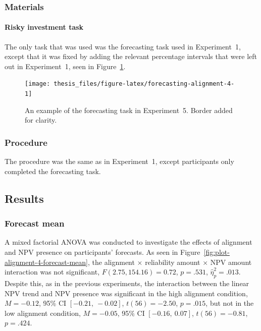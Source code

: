 \documentclass[a4paper, nobind, dvipsnames]{templates/ociamthesis}
\theoremstyle{definition}
\theoremstyle{definition}
\theoremstyle{definition}
\theoremstyle{definition}
\theoremstyle{remark}
\begin{document}
\subsubsection{Materials}

\paragraph{Risky investment task}

The only task that was used was the forecasting task used in Experiment~1,
except that it was fixed by adding the relevant percentage intervals that were
left out in Experiment~1, seen in Figure~\ref{fig:forecasting-alignment-4}.



\begin{figure}
\texttt{[image: thesis\_files/figure-latex/forecasting-alignment-4-1]} \caption{An example of the forecasting task in Experiment~5. Border added for clarity.}\label{fig:forecasting-alignment-4}
\end{figure}

\subsubsection{Procedure}

The procedure was the same as in Experiment~1, except participants only
completed the forecasting task.

\subsection{Results}

\subsubsection{Forecast mean}

A mixed factorial ANOVA was conducted to investigate the effects of alignment
and NPV presence on participants' forecasts. As seen in
Figure~\ref{fig:plot-alignment-4-forecast-mean}, the alignment \(\times\)
reliability amount \(\times\) NPV amount interaction was not significant,
\(F(2.75, 154.16) = 0.72\), \(p = .531\), \(\hat{\eta}^2_p = .013\).
Despite this, as in the previous experiments, the interaction between the linear
NPV trend and NPV presence was significant in the high alignment condition,
\(M = -0.12\), 95\% CI \([-0.21,~-0.02]\), \(t(56) = -2.50\), \(p = .015\), but not in the
low alignment condition,
\(M = -0.05\), 95\% CI \([-0.16,~0.07]\), \(t(56) = -0.81\), \(p = .424\).
\end{document}
